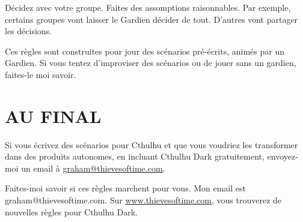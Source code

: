 Décidez avec votre groupe. Faites des assomptions raisonnables. Par exemple, certains groupes vont laisser le Gardien décider de tout. D'autres vont partager les décisions.

Ces règles sont construites pour jour des scénarios pré-écrits, animés par un Gardien. Si vous tentez d'improviser des scénarios ou de jouer sans un gardien, faites-le moi savoir.

\section{AU FINAL}

Si vous écrivez des scénarios pour Cthulhu et que vous voudriez les transformer dans des produits autonomes, en incluant Cthulhu Dark gratuitement, envoyez-moi un email à \href{mailto:graham@thievesoftime.com}{graham@thievesoftime.com}.

Faites-moi savoir si ces règles marchent pour vous. Mon email est graham@thievesoftime.com. Sur \href{https://thievesoftime.bigcartel.com/}{www.thievesoftime.com}, vous trouverez de nouvelles règles pour Cthulhu Dark.

\newpage

\tableofcontents
